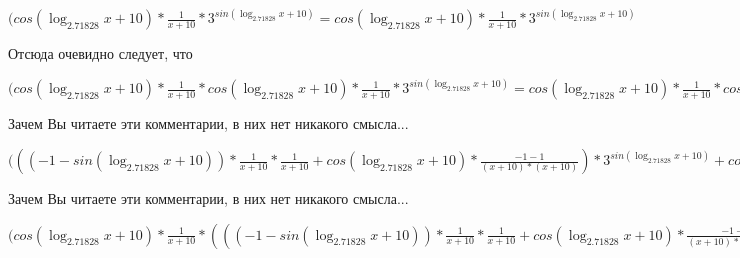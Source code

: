 \documentclass[12pt,a4paper,fleqn]{article}
\theoremstyle{definition}
\begin{document}
$(cos(\log_{ 2.71828 }{ x  +  10 }) * \frac{ 1 }{ x  +  10 }
 * { 3 }^{sin(\log_{ 2.71828 }{ x  +  10 })} = cos(\log_{ 2.71828 }{ x  +  10 }) * \frac{ 1 }{ x  +  10 }
 * { 3 }^{sin(\log_{ 2.71828 }{ x  +  10 })}$

Отсюда очевидно следует, что

$(cos(\log_{ 2.71828 }{ x  +  10 }) * \frac{ 1 }{ x  +  10 }
 * cos(\log_{ 2.71828 }{ x  +  10 }) * \frac{ 1 }{ x  +  10 }
 * { 3 }^{sin(\log_{ 2.71828 }{ x  +  10 })} = cos(\log_{ 2.71828 }{ x  +  10 }) * \frac{ 1 }{ x  +  10 }
 * cos(\log_{ 2.71828 }{ x  +  10 }) * \frac{ 1 }{ x  +  10 }
 * { 3 }^{sin(\log_{ 2.71828 }{ x  +  10 })}$

Зачем Вы читаете эти комментарии, в них нет никакого смысла...

$((( -1  - sin(\log_{ 2.71828 }{ x  +  10 })) * \frac{ 1 }{ x  +  10 }
 * \frac{ 1 }{ x  +  10 }
 + cos(\log_{ 2.71828 }{ x  +  10 }) * \frac{ -1  -  1 }{( x  +  10 ) * ( x  +  10 )}
) * { 3 }^{sin(\log_{ 2.71828 }{ x  +  10 })} + cos(\log_{ 2.71828 }{ x  +  10 }) * \frac{ 1 }{ x  +  10 }
 * cos(\log_{ 2.71828 }{ x  +  10 }) * \frac{ 1 }{ x  +  10 }
 * { 3 }^{sin(\log_{ 2.71828 }{ x  +  10 })} = (( -1  - sin(\log_{ 2.71828 }{ x  +  10 })) * \frac{ 1 }{ x  +  10 }
 * \frac{ 1 }{ x  +  10 }
 + cos(\log_{ 2.71828 }{ x  +  10 }) * \frac{ -1  -  1 }{( x  +  10 ) * ( x  +  10 )}
) * { 3 }^{sin(\log_{ 2.71828 }{ x  +  10 })} + cos(\log_{ 2.71828 }{ x  +  10 }) * \frac{ 1 }{ x  +  10 }
 * cos(\log_{ 2.71828 }{ x  +  10 }) * \frac{ 1 }{ x  +  10 }
 * { 3 }^{sin(\log_{ 2.71828 }{ x  +  10 })}$

Зачем Вы читаете эти комментарии, в них нет никакого смысла...

$(cos(\log_{ 2.71828 }{ x  +  10 }) * \frac{ 1 }{ x  +  10 }
 * ((( -1  - sin(\log_{ 2.71828 }{ x  +  10 })) * \frac{ 1 }{ x  +  10 }
 * \frac{ 1 }{ x  +  10 }
 + cos(\log_{ 2.71828 }{ x  +  10 }) * \frac{ -1  -  1 }{( x  +  10 ) * ( x  +  10 )}
) * { 3 }^{sin(\log_{ 2.71828 }{ x  +  10 })} + cos(\log_{ 2.71828 }{ x  +  10 }) * \frac{ 1 }{ x  +  10 }
 * cos(\log_{ 2.71828 }{ x  +  10 }) * \frac{ 1 }{ x  +  10 }
 * { 3 }^{sin(\log_{ 2.71828 }{ x  +  10 })}) = cos(\log_{ 2.71828 }{ x  +  10 }) * \frac{ 1 }{ x  +  10 }
 * ((( -1  - sin(\log_{ 2.71828 }{ x  +  10 })) * \frac{ 1 }{ x  +  10 }
 * \frac{ 1 }{ x  +  10 }
 + cos(\log_{ 2.71828 }{ x  +  10 }) * \frac{ -1  -  1 }{( x  +  10 ) * ( x  +  10 )}
) * { 3 }^{sin(\log_{ 2.71828 }{ x  +  10 })} + cos(\log_{ 2.71828 }{ x  +  10 }) * \frac{ 1 }{ x  +  10 }
 * cos(\log_{ 2.71828 }{ x  +  10 }) * \frac{ 1 }{ x  +  10 }
 * { 3 }^{sin(\log_{ 2.71828 }{ x  +  10 })})$
\end{document}
